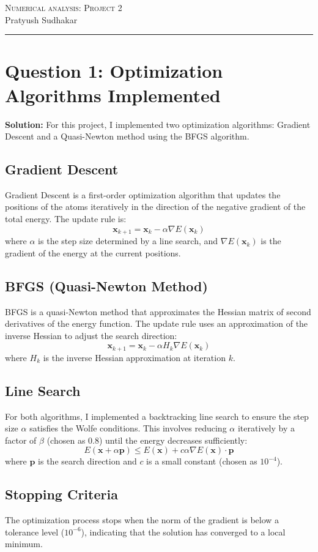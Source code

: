 \documentclass[11pt,onecolumn]{article}
\begin{document}
\noindent
\textsc{\Large Numerical analysis: Project 2}\\
Pratyush Sudhakar
\vspace{0.4cm}
\hrule
\noindent

\section*{Question 1: Optimization Algorithms Implemented}
\textbf{Solution:} For this project, I implemented two optimization algorithms: Gradient Descent and a Quasi-Newton method using the BFGS algorithm.
\subsection*{Gradient Descent}
Gradient Descent is a first-order optimization algorithm that updates the positions of the atoms iteratively in the direction of the negative gradient of the total energy. The update rule is:
\[ \mathbf{x}_{k+1} = \mathbf{x}_k - \alpha \nabla E(\mathbf{x}_k) \]
where \( \alpha \) is the step size determined by a line search, and \( \nabla E(\mathbf{x}_k) \) is the gradient of the energy at the current positions.
\subsection*{BFGS (Quasi-Newton Method)}
BFGS is a quasi-Newton method that approximates the Hessian matrix of second derivatives of the energy function. The update rule uses an approximation of the inverse Hessian to adjust the search direction:
\[ \mathbf{x}_{k+1} = \mathbf{x}_k - \alpha H_k \nabla E(\mathbf{x}_k) \]
where \( H_k \) is the inverse Hessian approximation at iteration \( k \).
\subsection*{Line Search}
For both algorithms, I implemented a backtracking line search to ensure the step size \( \alpha \) satisfies the Wolfe conditions. This involves reducing \( \alpha \) iteratively by a factor of \( \beta \) (chosen as 0.8) until the energy decreases sufficiently:
\[ E(\mathbf{x} + \alpha \mathbf{p}) \leq E(\mathbf{x}) + c \alpha \nabla E(\mathbf{x}) \cdot \mathbf{p} \]
where \( \mathbf{p} \) is the search direction and \( c \) is a small constant (chosen as \( 10^{-4} \)).
\subsection*{Stopping Criteria}
The optimization process stops when the norm of the gradient is below a tolerance level (\( 10^{-6} \)), indicating that the solution has converged to a local minimum.
\end{document}
